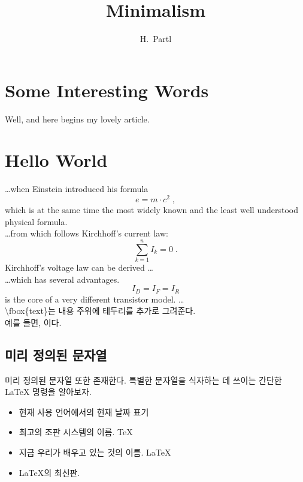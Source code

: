 \documentclass[a4paper, 11pt]{article}
\author{H.~Partl}  %
\title{Minimalism}
\begin{document}
\maketitle  %
\tableofcontents  %

\section{Some Interesting Words}
Well, and here begins my lovely article.

\section{Hello World}

\ldots when Einstein introduced his formula 
\begin{equation}
e = m \cdot c^2 \; ,
\end{equation}
which is at the same time the most widely known 
and the least well understood physical formula.
\newline \\

\ldots from which follows Kirchhoff's current law:
\begin{equation}
\sum_{k=1}^{n} I_k = 0 \; .
\end{equation}
Kirchhoff's voltage law can be derived \ldots
\newline \\

\ldots which has several advantages.
\begin{equation}
I_D = I_F = I_R
\end{equation}
is the core of a very different transistor model. \ldots
\newline \\

\textbackslash{}fbox\{text\}는 내용 주위에 테두리를 추가로 그려준다.
\\ 예를 들면, 이다.  
\newline \\

\subsection{미리 정의된 문자열}
미리 정의된 문자열 또한 존재한다. 특별한 문자열을 식자하는 데 쓰이는 간단한 \LaTeX{} 명령을 알아보자. 
\begin{itemize}
    \item [\textbackslash{}today] 현재 사용 언어에서의 현재 날짜 표기
    \item [\textbackslash{}TeX] 최고의 조판 시스템의 이름. \TeX
    \item [\textbackslash{}LaTeX] 지금 우리가 배우고 있는 것의 이름. \LaTeX
    \item [\textbackslash{}LaTeXe] \LaTeX{}의 최신판. \LaTeXe
\end{itemize}
\end{document}
